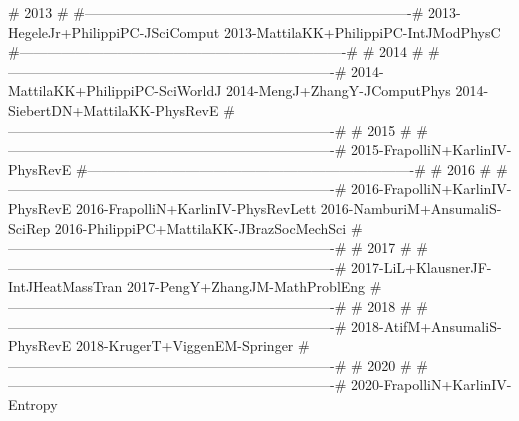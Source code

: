 #                                 2013                                 #
#----------------------------------------------------------------------#
2013-HegeleJr+PhilippiPC-JSciComput
2013-MattilaKK+PhilippiPC-IntJModPhysC
#----------------------------------------------------------------------#
#                                 2014                                 #
#----------------------------------------------------------------------#
2014-MattilaKK+PhilippiPC-SciWorldJ
2014-MengJ+ZhangY-JComputPhys
2014-SiebertDN+MattilaKK-PhysRevE
#----------------------------------------------------------------------#
#                                 2015                                 #
#----------------------------------------------------------------------#
2015-FrapolliN+KarlinIV-PhysRevE
#----------------------------------------------------------------------#
#                                 2016                                 #
#----------------------------------------------------------------------#
2016-FrapolliN+KarlinIV-PhysRevE
2016-FrapolliN+KarlinIV-PhysRevLett
2016-NamburiM+AnsumaliS-SciRep
2016-PhilippiPC+MattilaKK-JBrazSocMechSci
#----------------------------------------------------------------------#
#                                 2017                                 #
#----------------------------------------------------------------------#
2017-LiL+KlausnerJF-IntJHeatMassTran
2017-PengY+ZhangJM-MathProblEng
#----------------------------------------------------------------------#
#                                 2018                                 #
#----------------------------------------------------------------------#
2018-AtifM+AnsumaliS-PhysRevE
2018-KrugerT+ViggenEM-Springer
#----------------------------------------------------------------------#
#                                 2020                                 #
#----------------------------------------------------------------------#
2020-FrapolliN+KarlinIV-Entropy
